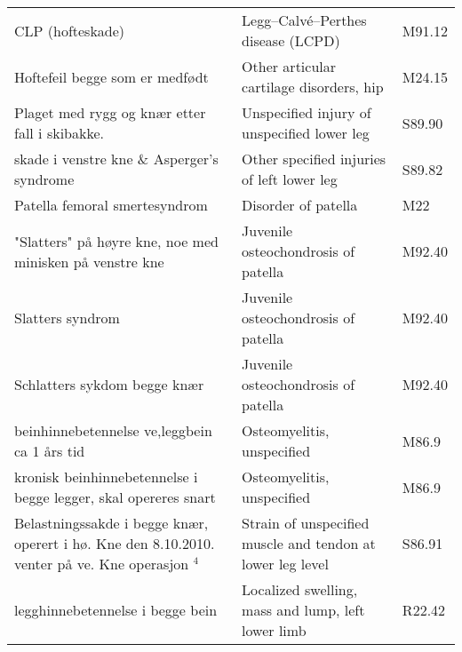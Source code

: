 \begin{table}[H]
{\begin{tabular}{|lll|}
		\hline
		
        \rowcolor[HTML]{88CC88}        
		\multicolumn{3}{|l|}{Hips and legs}   \\
		\hline   	
		
		CLP (hofteskade)                                                                                 & Legg–Calvé–Perthes disease (LCPD)                          & M91.12 \\
		Hoftefeil begge som er medfødt                                                                   & Other articular cartilage disorders, hip                   & M24.15 \\
		Plaget med rygg og knær etter fall i skibakke.                                                   & Unspecified injury of unspecified lower leg                & S89.90 \\
        skade i venstre kne \& Asperger's syndrome                                                        & Other specified injuries of left lower leg                 & S89.82 \\
		Patella femoral smertesyndrom                                                                    & Disorder of patella                                        & M22 \\
        "Slatters" på høyre kne, noe med minisken på venstre kne                                         & Juvenile osteochondrosis of patella                        & M92.40 \\
		Slatters syndrom                                                                                 & Juvenile osteochondrosis of patella                        & M92.40 \\      
		Schlatters sykdom begge knær                                                                     & Juvenile osteochondrosis of patella                        & M92.40 \\      
		beinhinnebetennelse ve,leggbein ca 1 års tid                                                     & Osteomyelitis, unspecified                                 & M86.9   \\
		kronisk beinhinnebetennelse i begge legger, skal opereres snart                                  & Osteomyelitis, unspecified                                 & M86.9   \\		
		Belastningssakde i begge knær, operert i hø. Kne den 8.10.2010.  venter på ve. Kne operasjon $^4$ & Strain of unspecified muscle and tendon at lower leg level & S86.91 \\		
		legghinnebetennelse i begge bein                                                                 & Localized swelling, mass and lump, left lower limb         & R22.42 \\

\end{tabular}}
\end{table}
